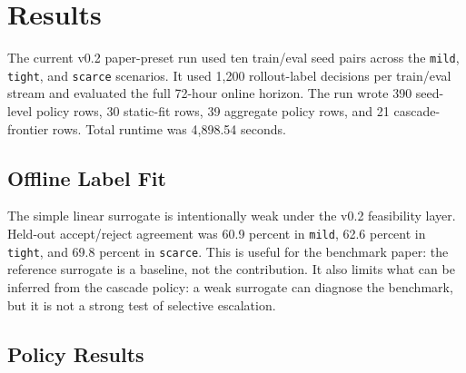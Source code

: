 \documentclass[11pt]{article}
\begin{document}
\section{Results}

The current v0.2 paper-preset run used ten train/eval seed pairs across the
\texttt{mild}, \texttt{tight}, and \texttt{scarce} scenarios. It used 1,200
rollout-label decisions per train/eval stream and evaluated the full 72-hour
online horizon. The run wrote 390 seed-level policy rows, 30 static-fit rows,
39 aggregate policy rows, and 21 cascade-frontier rows. Total runtime was
4,898.54 seconds.

\subsection{Offline Label Fit}

The simple linear surrogate is intentionally weak under the v0.2 feasibility
layer. Held-out accept/reject agreement was 60.9 percent in \texttt{mild},
62.6 percent in \texttt{tight}, and 69.8 percent in \texttt{scarce}. This is
useful for the benchmark paper: the reference surrogate is a baseline, not the
contribution. It also limits what can be inferred from the cascade policy: a
weak surrogate can diagnose the benchmark, but it is not a strong test of
selective escalation.

\subsection{Policy Results}
\end{document}
